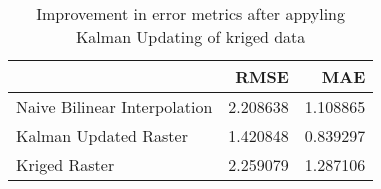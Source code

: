 \begin{table}
\caption{Improvement in error metrics after appyling Kalman Updating of kriged data}
\label{tab:florida_keys_lidar_error}
\begin{tabular}{lrr}
\toprule
 & RMSE & MAE \\
\midrule
Naive Bilinear Interpolation & 2.208638 & 1.108865 \\
Kalman Updated Raster & 1.420848 & 0.839297 \\
Kriged Raster & 2.259079 & 1.287106 \\
\bottomrule
\end{tabular}
\end{table}
